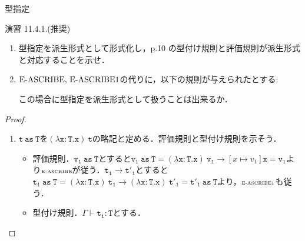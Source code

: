 \documentclass[9pt]{beamer}
\begin{document}
\begin{frame}{型指定}
\begin{alertblock}{演習 11.4.1.(推奨)}
    \begin{enumerate}
    \item 型指定を派生形式として形式化し，p.10 の型付け規則と評価規則が派生形式と対応することを示せ．
    \item $\text{\rm{E-ASCRIBE, E-ASCRIBE1}}$の代りに，以下の規則が与えられたとする:\begin{prooftree}
    \end{prooftree}
    この場合に型指定を派生形式として扱うことは出来るか．
    \end{enumerate}
\end{alertblock}
\begin{proof}
    \begin{enumerate}
    \item $\mathtt{t\ as\ T}$を$\mathtt{(\lambda x : T. x)\ t}$の略記と定める．評価規則と型付け規則を示そう．\begin{itemize}
    \item 評価規則．$\mathtt{v_{1}\ as\ T}$とすると$\mathtt{v_{1}\ as\ T} = \mathtt{(\lambda x : T. x)\ v_{1}} \rightarrow \left[x\mapsto v_{1}\right] \mathtt{x} = \mathtt{v_{1}}$より$\text{\tiny\rm{E-ASCRIBE}}$が従う．$\mathtt{t_{1}\rightarrow t'_{1}}$とすると$\mathtt{t_{1}\ as\ T} = \mathtt{(\lambda x:T. x)\ t_{1}}\rightarrow\mathtt{(\lambda x: T. x)\ t'_{1}} = \mathtt{t'_{1}\ as\ T}$より，$\text{\tiny\rm{E-ASCRIBE1}}$も従う．
    \item 型付け規則．$\Gamma\vdash\mathtt{t_{1}:T}$とする．
    \end{itemize}
    \end{enumerate}
\end{proof}
\end{frame}
\end{document}
